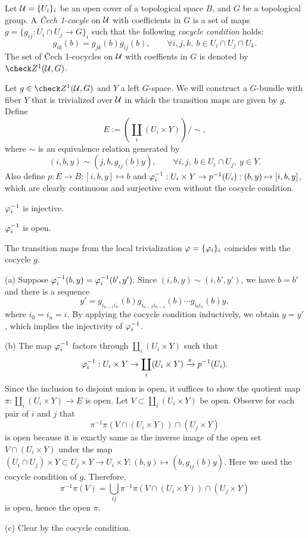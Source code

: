 \documentclass{../../large}
\begin{document}
\begin{prb}
Let $\mathcal{U}=\{U_i\}_i$ be an open cover of a topological space $B$, and $G$ be a topological group.
A \emph{\v Cech 1-cocyle} on $\mathcal{U}$ with coefficients in $G$ is a set of maps $g=\{g_{ij}:U_i\cap U_j\to G\}_i$ such that the following \emph{cocycle condition} holds:
\[g_{ik}(b)=g_{jk}(b)g_{ij}(b),\qquad\forall i,j,k,\ b\in U_i\cap U_j\cap U_k.\]
The set of \v Cech 1-cocycles on $\mathcal{U}$ with coeffients in $G$ is denoted by $\check Z^1(\cU,G)$.

Let $g\in\check Z^1(\cU,G)$ and $Y$ a left $G$-space.
We will construct a $G$-bundle with fiber $Y$ that is trivialized over $\mathcal{U}$ in which the transition maps are given by $g$.
Define
\[E:=\left(\coprod_i(U_i\times Y)\right)/\sim,\]
where $\sim$ is an equivalence relation generated by
\[(i,b,y)\sim(j,b,g_{ij}(b)y),
\qquad\forall i,j,\ b\in U_i\cap U_j,\ y\in Y.\]
Also define $p:E\to B:[i,b,y]\mapsto b$ and $\varphi_i^{-1}:U_i\times Y\to p^{-1}(U_i):(b,y)\mapsto[i,b,y]$, which are clearly continuous and surjective even without the cocycle condition.
\begin{parts}
\item $\varphi_i^{-1}$ is injective.
\item $\varphi_i^{-1}$ is open.
\item The transition maps from the local trivialization $\varphi=\{\varphi_i\}_i$ coincides with the cocycle $g$.
\end{parts}
\end{prb}
\begin{pf}
(a)
Suppose $\varphi_i^{-1}(b,y)=\varphi_i^{-1}(b',y')$.
Since $(i,b,y)\sim(i,b',y')$, we have $b=b'$ and there is a sequence
\[y'=g_{i_{n-1}i_n}(b)g_{i_{n-2}i_{n-1}}(b)\cdots g_{i_0i_1}(b)y,\]
where $i_0=i_n=i$.
By applying the cocycle condition inductively, we obtain $y=y'$, which implies the injectivity of $\varphi_i^{-1}$.

(b)
The map $\varphi_i^{-1}$ factors through $\coprod_i(U_i\times Y)$ such that
\[\varphi_i^{-1}:U_i\times Y\to\coprod_i(U_i\times Y)\xrightarrow{\pi}p^{-1}(U_i).\]
Since the inclusion to disjoint union is open, it suffices to show the quotient map $\pi:\coprod_i(U_i\times Y)\to E$ is open.
Let $V\subset\coprod_i(U_i\times Y)$ be open.
Observe for each pair of $i$ and $j$ that
\[\pi^{-1}\pi(V\cap(U_i\times Y))\cap(U_j\times Y)\]
is open because it is exactly same as the inverse image of the open set $V\cap(U_i\times Y)$ under the map $(U_i\cap U_j)\times Y\subset U_j\times Y\to U_i\times Y:(b,y)\mapsto(b,g_{ij}(b)y)$.
Here we used the cocycle condition of $g$.
Therefore,
\[\pi^{-1}\pi(V)=\bigcup_{ij}\pi^{-1}\pi(V\cap(U_i\times Y))\cap(U_j\times Y)\]
is open, hence the open $\pi$.

(c)
Clear by the cocycle condition.
\end{pf}
\end{document}
